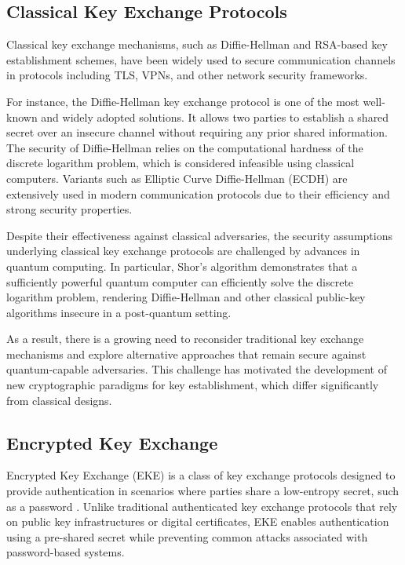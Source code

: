 \documentclass[12pt]{article}
\begin{document}
\subsection{Classical Key Exchange Protocols}

Classical key exchange mechanisms, such as Diffie-Hellman\cite{diffie1976} and RSA-based key establishment schemes, have been widely used to secure communication channels in protocols including TLS, VPNs, and other network security frameworks.

For instance, the Diffie-Hellman key exchange protocol is one of the most well-known and widely adopted solutions. It allows two parties to establish a shared secret over an insecure channel without requiring any prior shared information. The security of Diffie-Hellman relies on the computational hardness of the discrete logarithm problem\cite{diffie1976}, which is considered infeasible using classical computers. Variants such as Elliptic Curve Diffie-Hellman (ECDH) are extensively used in modern communication protocols due to their efficiency and strong security properties.

Despite their effectiveness against classical adversaries, the security assumptions underlying classical key exchange protocols are challenged by advances in quantum computing. In particular, Shor’s algorithm \cite{shor1994} demonstrates that a sufficiently powerful quantum computer can efficiently solve the discrete logarithm problem, rendering Diffie-Hellman and other classical public-key algorithms insecure in a post-quantum setting.

As a result, there is a growing need to reconsider traditional key exchange mechanisms and explore alternative approaches that remain secure against quantum-capable adversaries\cite{nist2024}. This challenge has motivated the development of new cryptographic paradigms for key establishment, which differ significantly from classical designs.




\subsection{Encrypted Key Exchange}

Encrypted Key Exchange (EKE) is a class of key exchange protocols designed to provide authentication in scenarios where parties share a low-entropy secret, such as a password \cite{bellovin1992}. Unlike traditional authenticated key exchange protocols that rely on public key infrastructures or digital certificates, EKE enables authentication using a pre-shared secret while preventing common attacks associated with password-based systems.
\end{document}

